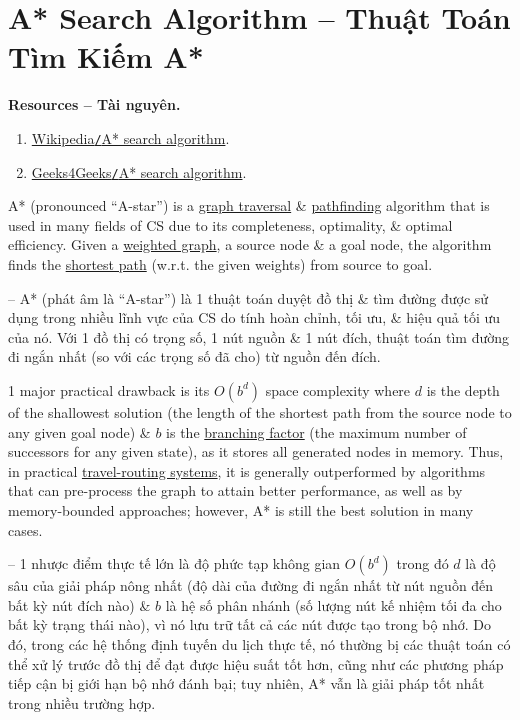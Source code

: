 \documentclass{article}
\begin{document}
\section{A* Search Algorithm -- Thuật Toán Tìm Kiếm A*}
\textbf{\textsf{Resources -- Tài nguyên.}}
\begin{enumerate}
    \item \href{https://en.wikipedia.org/wiki/A*_search_algorithm}{Wikipedia{\tt/}A* search algorithm}.
    
    \item \href{https://www.geeksforgeeks.org/a-search-algorithm/}{Geeks4Geeks{\tt/}A* search algorithm}.
\end{enumerate}
A* (pronounced ``A-star'') is a \href{https://en.wikipedia.org/wiki/Graph_traversal}{graph traversal} \& \href{https://en.wikipedia.org/wiki/Pathfinding}{pathfinding} algorithm that is used in many fields of CS due to its completeness, optimality, \& optimal efficiency. Given a \href{https://en.wikipedia.org/wiki/Weighted_graph}{weighted graph}, a source node \& a goal node, the algorithm finds the \href{https://en.wikipedia.org/wiki/Shortest_path_problem}{shortest path} (w.r.t. the given weights) from source to goal.

-- A* (phát âm là ``A-star'') là 1 thuật toán duyệt đồ thị \& tìm đường được sử dụng trong nhiều lĩnh vực của CS do tính hoàn chỉnh, tối ưu, \& hiệu quả tối ưu của nó. Với 1 đồ thị có trọng số, 1 nút nguồn \& 1 nút đích, thuật toán tìm đường đi ngắn nhất (so với các trọng số đã cho) từ nguồn đến đích.

1 major practical drawback is its $O(b^d)$ space complexity where $d$ is the depth of the shallowest solution (the length of the shortest path from the source node to any given goal node) \& $b$ is the \href{https://en.wikipedia.org/wiki/Branching_factor}{branching factor} (the maximum number of successors for any given state), as it stores all generated nodes in memory. Thus, in practical \href{https://en.wikipedia.org/wiki/Travel-routing_system}{travel-routing systems}, it is generally outperformed by algorithms that can pre-process the graph to attain better performance, as well as by memory-bounded approaches; however, A* is still the best solution in many cases.

-- 1 nhược điểm thực tế lớn là độ phức tạp không gian $O(b^d)$ trong đó $d$ là độ sâu của giải pháp nông nhất (độ dài của đường đi ngắn nhất từ nút nguồn đến bất kỳ nút đích nào) \& $b$ là hệ số phân nhánh (số lượng nút kế nhiệm tối đa cho bất kỳ trạng thái nào), vì nó lưu trữ tất cả các nút được tạo trong bộ nhớ. Do đó, trong các hệ thống định tuyến du lịch thực tế, nó thường bị các thuật toán có thể xử lý trước đồ thị để đạt được hiệu suất tốt hơn, cũng như các phương pháp tiếp cận bị giới hạn bộ nhớ đánh bại; tuy nhiên, A* vẫn là giải pháp tốt nhất trong nhiều trường hợp.
\end{document}
